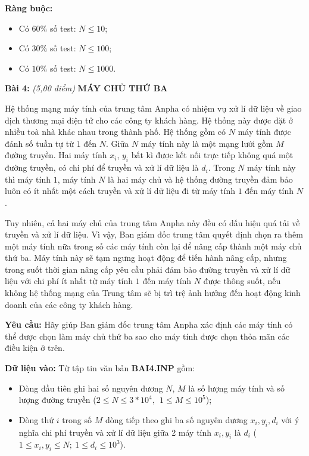 \documentclass[
]{article}
\begin{document}
\textbf{Ràng buộc:}

\begin{itemize}
\item
  Có \(60\%\) số test: \(N \leq 10\);
\item
  Có \(30\%\) số test: \(N \leq 100\);
\item
  Có \(10\%\) số test: \(N \leq 1000\).
\end{itemize}

\textbf{Bài 4:} \emph{(5,00 điểm)} \textbf{MÁY CHỦ THỨ BA}

Hệ thống mạng máy tính của trung tâm Anpha có nhiệm vụ xử lí dữ liệu về
giao dịch thương mại điện tử cho các công ty khách hàng. Hệ thống này
được đặt ở nhiều toà nhà khác nhau trong thành phố. Hệ thống gồm có
\(N\) máy tính được đánh số tuần tự từ \(1\) đến \(N\). Giữa \(N\) máy
tính này là một mạng lưới gồm \(M\) đường truyền. Hai máy tính
\(x_{i}\), \(y_{i}\) bất kì được kết nối trực tiếp không quá một đường
truyền, có chi phí để truyền và xử lí dữ liệu là \(d_{i}\). Trong \(N\)
máy tính này thì máy tính \(1\), máy tính \(N\) là hai máy chủ và hệ
thống đường truyền đảm bảo luôn có ít nhất một cách truyền và xử lí dữ
liệu đi từ máy tính \(1\) đến máy tính \(N\).

Tuy nhiên, cả hai máy chủ của trung tâm Anpha này đều có dấu hiệu quá
tải về truyền và xử lí dữ liệu. Vì vậy, Ban giám đốc trung tâm quyết
định chọn ra thêm một máy tính nữa trong số các máy tính còn lại để nâng
cấp thành một máy chủ thứ ba. Máy tính này sẽ tạm ngưng hoạt động để
tiến hành nâng cấp, nhưng trong suốt thời gian nâng cấp yêu cầu phải đảm
bảo đường truyền và xử lí dữ liệu với chi phí ít nhất từ máy tính \(1\)
đến máy tính \(N\) được thông suốt, nếu không hệ thống mạng của Trung
tâm sẽ bị trì trệ ảnh hưởng đến hoạt động kinh doanh của các công ty
khách hàng.

\textbf{Yêu cầu:} Hãy giúp Ban giám đốc trung tâm Anpha xác định các máy
tính có thể được chọn làm máy chủ thứ ba sao cho máy tính được chọn thỏa
mãn các điều kiện ở trên.

\textbf{Dữ liệu vào:} Từ tập tin văn bản \textbf{BAI4.INP} gồm:

\begin{itemize}
\item
  Dòng đầu tiên ghi hai số nguyên dương \(N\), \(M\) là số lượng máy
  tính và số lượng đường truyền
  (\(2 \leq N \leq 3*10^{4},\ \ 1 \leq M \leq 10^{5}\));
\item
  Dòng thứ \(i\) trong số \(M\) dòng tiếp theo ghi ba số nguyên dương
  \(x_{i},y_{i},d_{i}\) với ý nghĩa chi phí truyền và xử lí dữ liệu giữa
  2 máy tính \(x_{i},y_{i}\) là \(d_{i}\)
  (\(1 \leq x_{i},y_{i} \leq N;\ 1 \leq d_{i} \leq 10^{3}\)).
\end{itemize}
\end{document}
